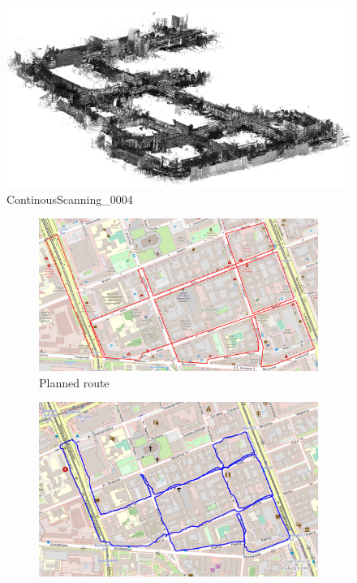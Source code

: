 \documentclass[a4paper,12pt]{book}
\begin{document}
\begin{enumerate}
	\begin{figure}[H]
		\includegraphics[width=1\linewidth]{cloud4}
		\caption{ContinousScanning\_0004}
	\end{figure}
	\begin{figure}[H]
	\centering
	\begin{subfigure}{1\textwidth}
		\centering
		\includegraphics[width=1\linewidth]{route_p4}
		\caption{Planned route}
		\label{fig:a4}
	\end{subfigure}%
	\linebreak
	\begin{subfigure}{1\textwidth}
		\centering
		\includegraphics[width=1\linewidth]{route_c4}

\end{subfigure}
\end{figure}
\end{enumerate}
\end{document}

